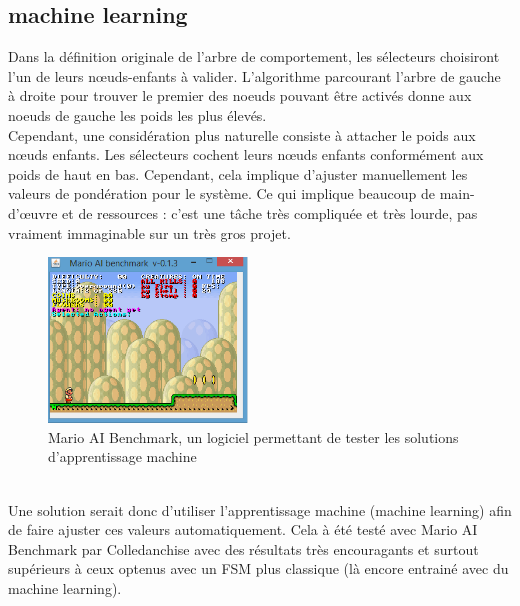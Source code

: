 \documentclass[titlepage]{article}
\begin{document}
		\subsection{machine learning}
		Dans la définition originale de l’arbre de comportement, les sélecteurs choisiront l’un de leurs nœuds-enfants à valider. L’algorithme parcourant l'arbre de gauche à droite pour trouver le premier des noeuds pouvant être activés donne aux noeuds de gauche les poids les plus élevés. \cite{Fu2016/08}
		\\
		Cependant, une considération plus naturelle consiste à attacher le poids aux nœuds enfants. Les sélecteurs cochent leurs nœuds enfants conformément aux poids de haut en bas. Cependant, cela implique d'ajuster manuellement les valeurs de pondération pour le système. Ce qui implique beaucoup de main-d'œuvre et de ressources : c'est une tâche très compliquée et très lourde, pas vraiment immaginable sur un très gros projet. \cite{Fu2016/08}
		\\
	\begin{figure}[h!]
		\centering
		\includegraphics[width=200px]{img/mario-ai-benchmark.png}
		\caption{Mario AI Benchmark, un logiciel permettant de tester les solutions d'apprentissage machine}
		\label{fig:ai-benchmark}
	\end{figure}
		\\
		Une solution serait donc d'utiliser l'apprentissage machine (machine learning) afin de faire ajuster ces valeurs automatiquement. Cela à été testé avec Mario AI Benchmark par Colledanchise avec des résultats très encouragants et surtout supérieurs à ceux optenus avec un FSM plus classique (là encore entrainé avec du machine learning). \cite{colledanchise_2017}
\end{document}
